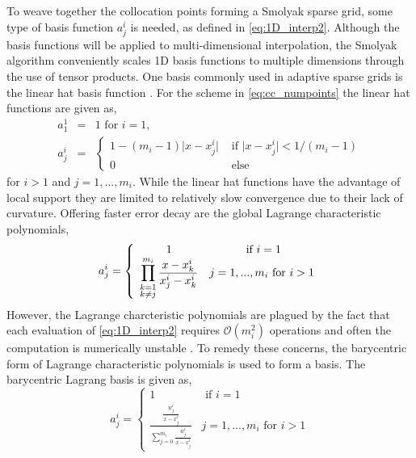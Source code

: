 To weave together the collocation points forming a Smolyak sparse grid, some type of basis function $a_{j}^i$ is needed, as defined in \ref{eq:1D_interp2}. Although the basis functions will be applied to multi-dimensional interpolation, the Smolyak algorithm conveniently scales 1D basis functions to multiple dimensions through the use of tensor products. One basis commonly used  in adaptive sparse grids is the linear hat basis function \cite{Agarwal}. For the scheme in \ref{eq:cc_numpoints} the linear hat functions are given as, 
\begin{eqnarray} \label{eq:linear_hat_basis}
    a_{1}^{1} &=& 1 \text{ for } i=1, \\
    a_{j}^{i} &=& \left\{
     \begin{array}{cc}
      1-(m_i-1)\vert x-x_j^i\vert   & \text{ if }
      \vert x-x_j^i\vert < 1/(m_i-1) \\
       0   & \text{ else } \nonumber
     \end{array}
    \right.
\end{eqnarray}
for $i>1$ and $j=1,...,m_i$. While the linear hat functions have the advantage of local support they are limited to relatively slow convergence due to their lack of curvature. Offering faster error decay are the global Lagrange characteristic polynomials, 
\begin{equation} \label{eq:lagrange_basis}
    a_j^i = \left\{
     \begin{array}{cc}
      1   & \text{ if } i=1 \\
      \displaystyle \prod_{\begin{subarray}{l}
              k=1 \\
              k \neq j
             \end{subarray}}^{m_i}
       \frac{x-x_k^i}{x_j^i-x_k^i}   & j=1,...,m_i \text{ for } i>1    
     \end{array}
    \right.
\end{equation}  
However, the Lagrange charcteristic polynomials are plagued by the fact that each evaluation of \ref{eq:1D_interp2} requires $\mathcal{O}(m_i^2)$ operations and  often the computation is numerically unstable \cite{BaryCentIntrp}. To remedy these concerns, the barycentric form of Lagrange characteristic polynomials is used to form a basis. The barycentric Lagrang basis is given as,
\begin{equation} \label{eq:barycentric_basis}
    a_j^i = \left\{
     \begin{array}{cc}
      1   & \text{ if } i=1 \\
      \displaystyle \frac{\frac{w_j^i}{x-x_j^i} }
       {\sum_{j=0}^{m_i} 
        \frac{w_j^i}{x-x_j^i}}   & j=1,...,m_i \text{ for } i>1
     \end{array}
    \right.
\end{equation} 
